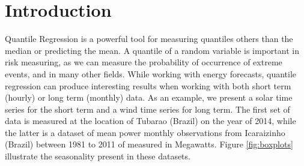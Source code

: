 \section{Introduction}




Quantile Regression is a powerful tool for measuring quantiles others than the median or predicting the mean. A quantile of a random variable is important in risk measuring, as we can measure the probability of occurrence of extreme events, and in many other fields. While working with energy forecasts, quantile regression can produce interesting results when working with both short term (hourly) or long term (monthly) data. As an example, we present a solar time series for the short term and a wind time series for long term. The first set of data is measured at the location of Tubarao (Brazil) on the year of 2014, while the latter is a dataset of mean power  monthly observations from Icaraizinho (Brazil) between 1981 to 2011 of measured in Megawatts. Figure \ref{fig:boxplots} illustrate the seasonality present in these datasets.


%


